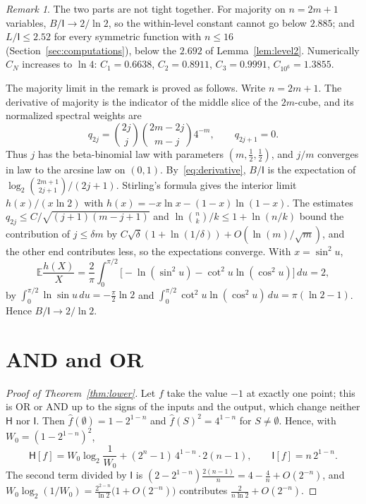 \documentclass[11pt]{amsart}
\theoremstyle{definition}
\theoremstyle{remark}
\newtheorem{remark}[theorem]{Remark}
\newcommand{\E}{\mathbb E}
\newcommand{\HH}{\mathsf H}
\newcommand{\I}{\mathsf I}
\newcommand{\wh}[1]{\widehat{#1}}
\begin{document}
\begin{remark}
The two parts are not tight together. For majority on $n=2m+1$ variables, $B/\I\to2/\ln2$, so the within-level constant cannot go below $2.885$; and $L/\I\le2.52$ for every symmetric function with $n\le16$ (Section~\ref{sec:computations}), below the $2.692$ of Lemma~\ref{lem:level2}. Numerically $C_N$ increases to $\ln4$: $C_1=0.6638$, $C_2=0.8911$, $C_3=0.9991$, $C_{10^6}=1.3855$.
\end{remark}

The majority limit in the remark is proved as follows. Write $n=2m+1$. The derivative of majority is the indicator of the middle slice of the $2m$-cube, and its normalized spectral weights are
\[
 q_{2j}=\binom{2j}{j}\binom{2m-2j}{m-j}4^{-m},\qquad q_{2j+1}=0.
\]
Thus $j$ has the beta-binomial law with parameters $(m,\tfrac12,\tfrac12)$, and $j/m$ converges in law to the arcsine law on $(0,1)$. By~\eqref{eq:derivative}, $B/\I$ is the expectation of $\log_2\binom{2m+1}{2j+1}/(2j+1)$. Stirling's formula gives the interior limit $h(x)/(x\ln2)$ with $h(x)=-x\ln x-(1-x)\ln(1-x)$. The estimates $q_{2j}\le C/\sqrt{(j+1)(m-j+1)}$ and $\ln\binom nk/k\le1+\ln(n/k)$ bound the contribution of $j\le\delta m$ by $C\sqrt\delta(1+\ln(1/\delta))+O(\ln(m)/\sqrt m)$, and the other end contributes less, so the expectations converge. With $x=\sin^2u$,
\[
 \E\frac{h(X)}X=\frac2\pi\int_0^{\pi/2}\bigl[-\ln(\sin^2u)-\cot^2u\ln(\cos^2u)\bigr]\,du=2,
\]
by $\int_0^{\pi/2}\ln\sin u\,du=-\frac\pi2\ln2$ and $\int_0^{\pi/2}\cot^2u\ln(\cos^2u)\,du=\pi(\ln2-1)$. Hence $B/\I\to2/\ln2$.

\section{AND and OR}\label{sec:lower}

\begin{proof}[Proof of Theorem~\ref{thm:lower}]
Let $f$ take the value $-1$ at exactly one point; this is OR or AND up to the signs of the inputs and the output, which change neither $\HH$ nor $\I$. Then $\wh f(\emptyset)=1-2^{1-n}$ and $\wh f(S)^2=4^{1-n}$ for $S\ne\emptyset$. Hence, with $W_0=(1-2^{1-n})^2$,
\[
 \HH[f]=W_0\log_2\frac1{W_0}+(2^n-1)\,4^{1-n}\cdot2(n-1),\qquad \I[f]=n\,2^{1-n}.
\]
The second term divided by $\I$ is $(2-2^{1-n})\frac{2(n-1)}n=4-\frac4n+O(2^{-n})$, and $W_0\log_2(1/W_0)=\frac{2^{2-n}}{\ln2}\bigl(1+O(2^{-n})\bigr)$ contributes $\frac{2}{n\ln2}+O(2^{-n})$.
\end{proof}
\end{document}
